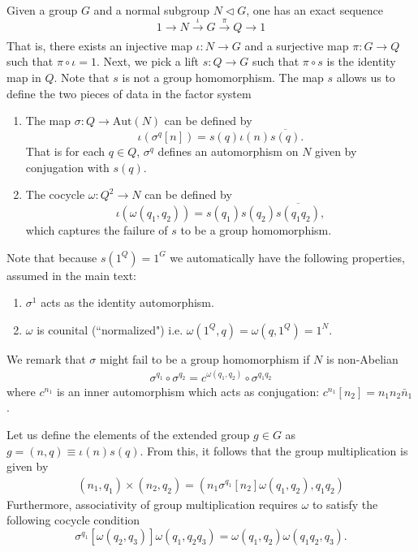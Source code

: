 \documentclass[nofootinbib,prx,twocolumn,showpacs,superscriptaddress,notitlepage,amsmath,amssymb]{revtex4-2}
\theoremstyle{definition}
\def\aut#1#2{\sigma^{#1} \left [ {#2} \right]}
\begin{document}
Given a group $G$ and a normal subgroup $N \triangleleft G$, one has an exact sequence
\begin{equation}
 1 \rightarrow N  \xrightarrow[]{\iota} G  \xrightarrow[]{\pi} Q \rightarrow 1
 \label{eq:extension}
\end{equation}
That is, there exists an injective map $\iota: N \rightarrow G$ and a surjective map $\pi:G \rightarrow Q$ such that $\pi \circ \iota = 1$. Next, we pick a lift $s:Q\rightarrow G$ such that $\pi \circ s$ is the identity map in $Q$. Note that $s$ is not a group homomorphism. The map $s$ allows us to define the two pieces of data in the factor system

\begin{enumerate}
    \item The map $\sigma:Q\rightarrow \text{Aut}(N)$ can be defined by $$\iota(\sigma^q[n]) = s(q) \iota(n) \overline{s(q)}.$$ That is for each $q \in Q$, $\sigma^q$ defines an automorphism on $N$ given by conjugation with $s(q)$.
    \item The cocycle $\omega:Q^2\rightarrow N$ can be defined by
    $$ \iota(\omega(q_1,q_2)) = s(q_1) s(q_2)\overline{s(q_1q_2)},$$
    which captures the failure of $s$ to be a group homomorphism.
\end{enumerate}

Note that because $s(1^Q) =1^G$ we automatically have the following properties, assumed in the main text:
\begin{enumerate}
\item $\sigma^1$ acts as the identity automorphism.
\item $\omega$ is counital (``normalized") i.e. $\omega(1^Q,q) = \omega(q,1^Q)=1^N$.
\end{enumerate}
We remark that $\sigma$ might fail to be a group homomorphism if $N$ is non-Abelian
\begin{align}
    \sigma^{q_1} \circ \sigma^{q_2} = c^{\omega(q_1,q_2)} \circ \sigma^{q_1q_2}
\end{align}
where $c^{n_1}$ is an inner automorphism which acts as conjugation: $c^{n_1}[n_2]=n_1n_2\bar{n}_1$.

Let us define the elements of the extended group $g\in G$ as $g= (n,q) \equiv \iota(n) s(q)$. From this, it follows that the group multiplication is given by
\begin{align}
    (n_1,q_1) \times (n_2,q_2) = (n_1\aut{q_1}{n_2}\omega(q_1,q_2),q_1q_2)
    \label{eq:multiplicationlawapp}
\end{align}
Furthermore, associativity of group multiplication requires $\omega$ to satisfy the following cocycle condition
\begin{equation}
    \aut{q_1}{\omega(q_2,q_3)} \omega(q_1,q_2q_3)  = \omega(q_1,q_2) \omega(q_1q_2,q_3).
    \label{equ:cocycleconditionapp}
\end{equation}
\end{document}
